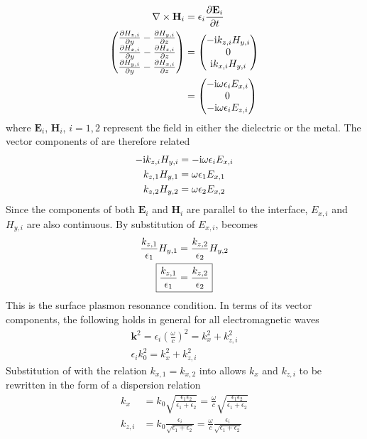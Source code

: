 \documentclass[a4paper,titlepage,onecolumn]{report}
\begin{document}
\begin{align}
\nabla \times \mathbf{H}_i &= \epsilon_i \frac{\partial \mathbf{E}_i}{\partial t}\\
\begin{pmatrix}
\frac{\partial H_{z,i}}{\partial y} - \frac{\partial H_{y,i}}{\partial z}\\
\frac{\partial H_{x,i}}{\partial y} - \frac{\partial H_{z,i}}{\partial z}\\
\frac{\partial H_{y,i}}{\partial y} - \frac{\partial H_{x,i}}{\partial z}
\end{pmatrix}
&= \begin{pmatrix}
-{\mathrm{i}} k_{z,i} H_{y,i}\\
0\\
{\mathrm{i}} k_{x,i} H_{y,i}
\end{pmatrix}
\\
&= \begin{pmatrix}
-{\mathrm{i}} \omega \epsilon_i E_{x,i}\\
0\\
-{\mathrm{i}} \omega \epsilon_i E_{z,i}
\end{pmatrix}
\label{eqn:vectordisp}
\end{align}
where $\mathbf{E}_i$, $\mathbf{H}_i$, $i=1,2$ represent the field in either the
dielectric or the metal.  The vector components of
 are therefore related 
\begin{align}
-{\mathrm{i}} k_{z,i} H_{y,i} &= -{\mathrm{i}} \omega \epsilon_i E_{x,i}\\
k_{z,1} H_{y,1} &= \omega \epsilon_1 E_{x,1}\\
k_{z,2} H_{y,2} &= \omega \epsilon_2 E_{x,2}
\label{eqn:spderivsteptwo}
\end{align}
Since the components of both $\mathbf{E}_i$ and $\mathbf{H}_i$ are
parallel to the interface, $E_{x,i}$ and $H_{y,i}$ are also
continuous. By substitution of $E_{x,i}$,  becomes
\begin{align}
\frac{k_{z,1}}{\epsilon_1}H_{y,1}&=\frac{k_{z,2}}{\epsilon_2}H_{y,2}\\ 
\Aboxed{
\frac{k_{z,1}}{\epsilon_1}&=\frac{k_{z,2}}{\epsilon_2} 
}
\label{eqn:sprcondition}
\end{align}
This is the surface plasmon resonance condition.  In terms of
its vector components, the following holds in general for all electromagnetic
waves
\begin{align}
\mathbf{k}^2=\epsilon_i \left(\frac{\omega}{c}\right)^2=k_x^2 + k_{z,i}^2\\
\epsilon_i k_0^2=k_x^2 + k_{z,i}^2
\label{eqn:dispersion1}
\end{align}
Substitution of  with the relation 
$k_{x,1}=k_{x,2}$ into  allows 
$k_x$ and $k_{z,i}$ to be rewritten in the form of a dispersion relation
\begin{align}
k_x &= k_0\sqrt{\frac{\epsilon_1 \epsilon_2}{\epsilon_1+\epsilon_2}} 
= \frac{\omega}{c}\sqrt{\frac{\epsilon_1 \epsilon_2}{\epsilon_1+\epsilon_2}}\\
k_{z,i} &= k_0\frac{\epsilon_i}{\sqrt{\epsilon_1+\epsilon_2}}
= \frac{\omega}{c}\frac{\epsilon_i}{\sqrt{\epsilon_1+\epsilon_2}}
\end{align}
\end{document}
